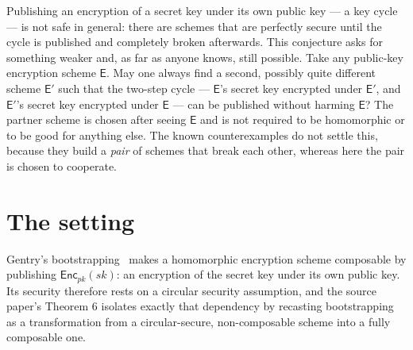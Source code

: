 \documentclass{conjura-conjecture}
\newcommand{\Enc}{\mathsf{Enc}}
\begin{document}

\vspace{0.4em}

\begin{informalconjecture}
Publishing an encryption of a secret key under its own public key --- a
key cycle --- is not safe in general: there are schemes that are
perfectly secure until the cycle is published and completely broken
afterwards. This conjecture asks for something weaker and, as far as
anyone knows, still possible. Take any public-key encryption scheme
$\mathsf{E}$. May one always find a second, possibly quite different
scheme $\mathsf{E}'$ such that the two-step cycle --- $\mathsf{E}$'s
secret key encrypted under $\mathsf{E}'$, and $\mathsf{E}'$'s secret
key encrypted under $\mathsf{E}$ --- can be published without harming
$\mathsf{E}$? The partner scheme is chosen after seeing $\mathsf{E}$
and is not required to be homomorphic or to be good for anything else.
The known counterexamples do not settle this, because they build a
\emph{pair} of schemes that break each other, whereas here the pair is
chosen to cooperate.
\end{informalconjecture}

\section{The setting}\label{sec:setting}

Gentry's bootstrapping~\cite{Gen09} makes a homomorphic encryption
scheme composable by publishing $\Enc_{pk}(sk)$: an encryption of the
secret key under its own public key. Its security therefore rests on a
circular security assumption, and the source paper's Theorem 6 isolates
exactly that dependency by recasting bootstrapping as a transformation
from a circular-secure, non-composable scheme into a fully composable
one.
\end{document}
